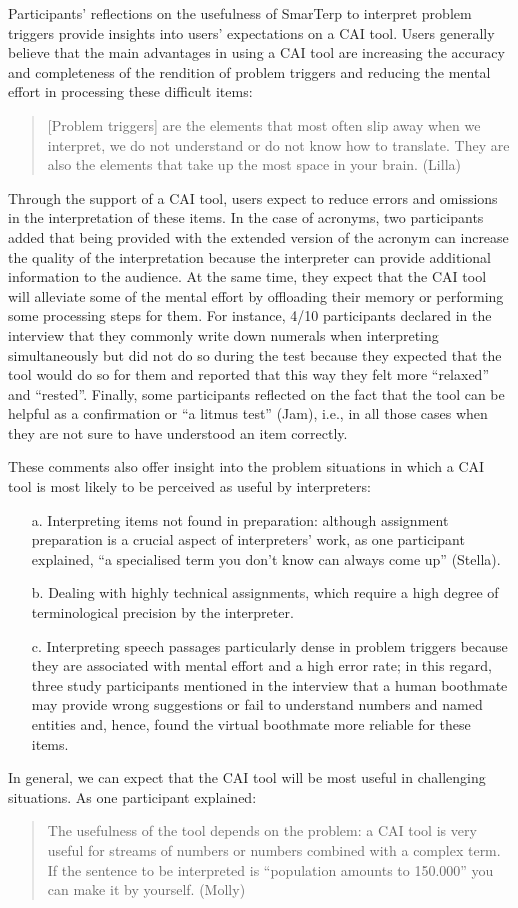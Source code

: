 Participants’ reflections on the usefulness of SmarTerp to interpret problem triggers provide insights into users’ expectations on a CAI tool. Users generally believe that the main advantages in using a CAI tool are increasing the accuracy and completeness of the rendition of problem triggers and reducing the mental effort in processing these difficult items:
\begin{quote}
    [Problem triggers] are the elements that most often slip away when we interpret, we do not understand or do not know how to translate. They are also the elements that take up the most space in your brain. (Lilla)
\end{quote}
Through the support of a CAI tool, users expect to reduce errors and omissions in the interpretation of these items. In the case of acronyms, two participants added that being provided with the extended version of the acronym can increase the quality of the interpretation because the interpreter can provide additional information to the audience. At the same time, they expect that the CAI tool will alleviate some of the mental effort by offloading their memory or performing some processing steps for them. For instance, 4/10 participants declared in the interview that they commonly write down numerals when interpreting simultaneously but did not do so during the test because they expected that the tool would do so for them and reported that this way they felt more ``relaxed'' and ``rested''. Finally, some participants reflected on the fact that the tool can be helpful as a confirmation or ``a litmus test'' (Jam), i.e., in all those cases when they are not sure to have understood an item correctly.

These comments also offer insight into the problem situations in which a CAI tool is most likely to be perceived as useful by interpreters:
\begin{itemize}
    \item [a.] Interpreting items not found in preparation: although assignment preparation is a crucial aspect of interpreters’ work, as one participant explained, ``a specialised term you don’t know can always come up'' (Stella).
\item [b.] Dealing with highly technical assignments, which require a high degree of terminological precision by the interpreter.
\item [c.] Interpreting speech passages particularly dense in problem triggers because they are associated with mental effort and a high error rate; in this regard, three study participants mentioned in the interview that a human boothmate may provide wrong suggestions or fail to understand numbers and named entities and, hence, found the virtual boothmate more reliable for these items.
\end{itemize}
In general, we can expect that the CAI tool will be most useful in challenging situations. As one participant explained:
\begin{quote}
    The usefulness of the tool depends on the problem: a CAI tool is very useful for streams of numbers or numbers combined with a complex term. If the sentence to be interpreted is ``population amounts to 150.000'' you can make it by yourself. (Molly)\end{quote}

